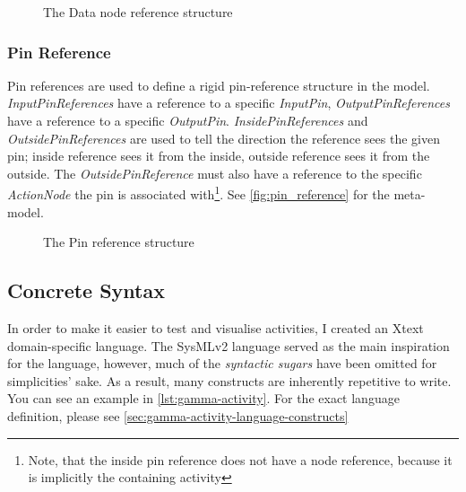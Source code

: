 \begin{figure}[!ht]
	\centering
	
	\caption{The Data node reference structure}
	\label{fig:data_source_target_reference_example}
\end{figure}

\subsubsection{Pin Reference}

Pin references are used to define a rigid pin-reference structure in the model. \emph{InputPinReferences} have a reference to a specific \emph{InputPin}, \emph{OutputPinReferences} have a reference to a specific \emph{OutputPin}. \emph{InsidePinReferences} and \emph{OutsidePinReferences} are used to tell the direction the reference sees the given pin; inside reference sees it from the inside, outside reference sees it from the outside. The \emph{OutsidePinReference} must also have a reference to the specific \emph{ActionNode} the pin is associated with\footnote{Note, that the inside pin reference does not have a node reference, because it is implicitly the containing activity}. See \autoref{fig:pin_reference} for the meta-model.

\begin{figure}[!ht]
	\centering
	
	\caption{The Pin reference structure}
	\label{fig:pin_reference}
\end{figure}

\subsection{Concrete Syntax}

In order to make it easier to test and visualise activities, I created an Xtext domain-specific language. The SysMLv2 language served as the main inspiration for the language, however, much of the \emph{syntactic sugars} have been omitted for simplicities' sake. As a result, many constructs are inherently repetitive to write. You can see an example in \autoref{lst:gamma-activity}. For the exact language definition, please see \autoref{sec:gamma-activity-language-constructs}

